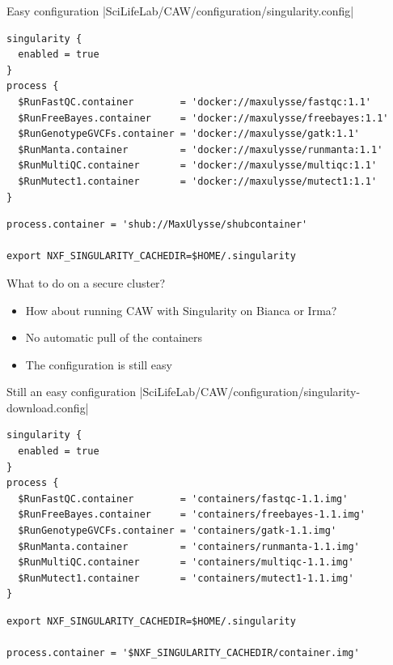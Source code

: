 \documentclass{beamer}
\begin{document}
\begin{frame}[fragile]{Easy configuration}
|SciLifeLab/CAW/configuration/singularity.config|
\begin{verbatim}
singularity {
  enabled = true
}
process {
  $RunFastQC.container        = 'docker://maxulysse/fastqc:1.1'
  $RunFreeBayes.container     = 'docker://maxulysse/freebayes:1.1'
  $RunGenotypeGVCFs.container = 'docker://maxulysse/gatk:1.1'
  $RunManta.container         = 'docker://maxulysse/runmanta:1.1'
  $RunMultiQC.container       = 'docker://maxulysse/multiqc:1.1'
  $RunMutect1.container       = 'docker://maxulysse/mutect1:1.1'
}

\end{verbatim}
\pause
\begin{verbatim}
process.container = 'shub://MaxUlysse/shubcontainer'

export NXF_SINGULARITY_CACHEDIR=$HOME/.singularity
\end{verbatim}
\end{frame}

\begin{frame}{What to do on a secure cluster?}
	\begin{itemize}
		\item How about running CAW with Singularity on Bianca or Irma?
		\pause
		\item No automatic pull of the containers
		\pause
		\item The configuration is still easy
	\end{itemize}
\end{frame}

\begin{frame}[fragile]{Still an easy configuration}
	|SciLifeLab/CAW/configuration/singularity-download.config|
\begin{verbatim}
singularity {
  enabled = true
}
process {
  $RunFastQC.container        = 'containers/fastqc-1.1.img'
  $RunFreeBayes.container     = 'containers/freebayes-1.1.img'
  $RunGenotypeGVCFs.container = 'containers/gatk-1.1.img'
  $RunManta.container         = 'containers/runmanta-1.1.img'
  $RunMultiQC.container       = 'containers/multiqc-1.1.img'
  $RunMutect1.container       = 'containers/mutect1-1.1.img'
}
\end{verbatim}

\begin{verbatim}
export NXF_SINGULARITY_CACHEDIR=$HOME/.singularity

process.container = '$NXF_SINGULARITY_CACHEDIR/container.img'
\end{verbatim}
\end{frame}
\end{document}
